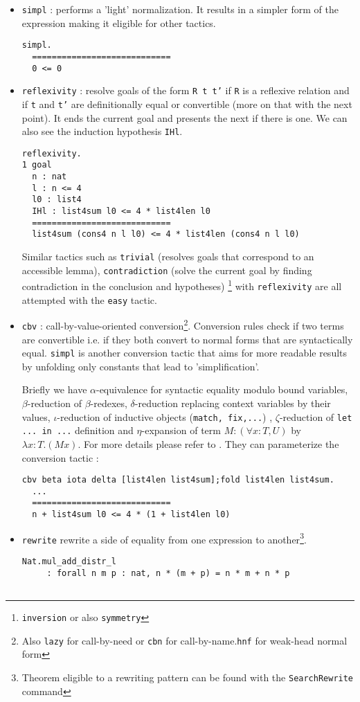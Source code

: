 \documentclass{article}
\begin{document}
\begin{itemize}
            \item \texttt{simpl} : performs a 'light' normalization. It results in a simpler form of the expression making it eligible for other tactics.
            \begin{verbatim}simpl.
  ============================
  0 <= 0\end{verbatim}
            \item \texttt{reflexivity} : resolve goals of the form \texttt{R t t'} if \texttt{R} is a reflexive relation and if \texttt{t} and \texttt{t'} are definitionally equal or convertible
            (more on that with the next point). It ends the current goal and presents the next if there is one. We can also see the induction hypothesis \texttt{IHl}.
            \begin{verbatim}reflexivity.
1 goal
  n : nat
  l : n <= 4
  l0 : list4
  IHl : list4sum l0 <= 4 * list4len l0
  ============================
  list4sum (cons4 n l l0) <= 4 * list4len (cons4 n l l0)\end{verbatim}
             Similar tactics such as \texttt{trivial} (resolves goals that correspond to an accessible lemma), \texttt{contradiction} (solve the current goal by finding contradiction in the conclusion and hypotheses)  \footnote{\texttt{inversion} or also \texttt{symmetry}} with \texttt{reflexivity} are all attempted with the \texttt{easy} tactic.

            \item \texttt{cbv} : call-by-value-oriented conversion\footnote{Also \texttt{lazy} for call-by-need or \texttt{cbn} for call-by-name.\texttt{hnf} for weak-head normal form}. Conversion rules check if two terms are convertible i.e. if they both convert to normal forms that are syntactically equal. \texttt{simpl} is another conversion tactic that aims for more readable results by unfolding only constants that lead to 'simplification'.
            \par Briefly we have $\alpha$-equivalence for syntactic equality modulo bound variables, $\beta$-reduction of $\beta$-redexes, $\delta$-reduction replacing context variables by their values, $\iota$-reduction of inductive objects (\texttt{match, fix,...}) , $\zeta$-reduction of \texttt{let ... in ...} definition and $\eta$-expansion of term $M : (\forall x : T,U)$ by $\lambda x : T.(M x)$. For more details please refer to \cite{Coq}. They can parameterize the conversion tactic :
            \begin{verbatim}cbv beta iota delta [list4len list4sum];fold list4len list4sum.
  ...
  ============================
  n + list4sum l0 <= 4 * (1 + list4len l0)\end{verbatim}
            \item \texttt{rewrite} rewrite a side of equality from one expression to another\footnote{Theorem eligible to a rewriting pattern can be found with the \texttt{SearchRewrite} command}.
            \begin{verbatim}Nat.mul_add_distr_l 
     : forall n m p : nat, n * (m + p) = n * m + n * p 
     

\end{verbatim}
\end{itemize}
\end{document}
